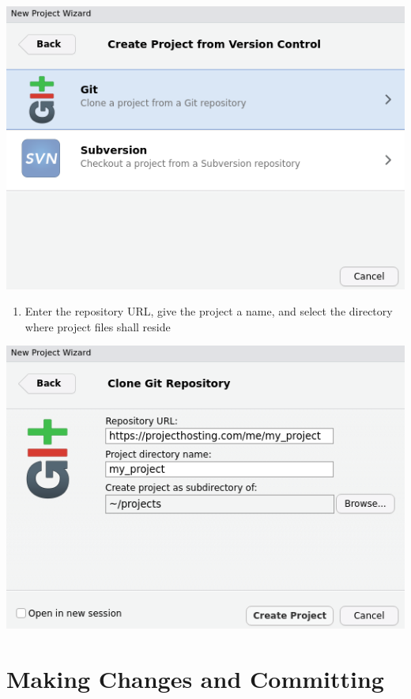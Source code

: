 \documentclass[
]{book}
\providecommand{\tightlist}{%
  \setlength{\itemsep}{0pt}\setlength{\parskip}{0pt}}
\begin{document}
\includegraphics{images/02-newprojectgit_2.png}

\begin{enumerate}
\def\labelenumi{\arabic{enumi}.}
\setcounter{enumi}{3}
\tightlist
\item
  Enter the repository URL, give the project a name, and select the directory where project files shall reside
\end{enumerate}

\includegraphics{images/02-newprojectgit_3.png}

\hypertarget{making-changes-and-committing}{%
\section{Making Changes and Committing}\label{making-changes-and-committing}}
\end{document}
